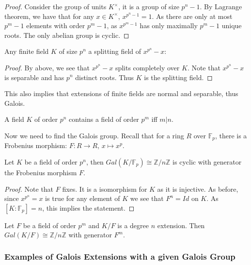 \documentclass[main.tex]{subfiles}
\begin{document}
\begin{proof}
Consider the group of units $K^\times$, it is a group of size $p^n -1$. By Lagrange theorem, we have that for any $x \in K^\times$, $x^{p^n -1} = 1$. As there are only at most $p^m-1$ elements with order $p^m-1$, as $x^{p^m -1}$ has only maximally $p^m -1$ unique roots. The only abelian group is cyclic.
\end{proof}


\begin{lemma}
Any finite field $K$ of size $p^n$ a splitting field of $x^{p^n} -x$:
\end{lemma}

\begin{proof}
By above, we see that $x^{p^n} -x$ splits completely over $K$. Note that $x^{p^n} -x$ is separable and has $p^n$ distinct roots. Thus $K$ is the splitting field.
\end{proof}

This also implies that extensions of finite fields are normal and separable, thus Galois.

A field $K$ of order $p^n$ contains a field of order $p^m$ iff $m | n$. 

Now we need to find the Galois group. Recall that for a ring $R$ over $\mathbb{F}_p$, there is a Frobenius morphism: $F : R \rightarrow R$, $x \mapsto x^p$.

\begin{theorem}
Let $K$ be a field of order $p^n$, then $Gal(K/\mathbb{F}_p) \cong \mathbb{Z}/n\mathbb{Z}$ is cyclic with generator the Frobenius morphism $F$.
\end{theorem}

\begin{proof}
Note that $F$ fixes. It is a isomorphism for $K$ as it is injective. As before, since $x^{p^n} = x$ is true for any element of $K$ we see that $F^n = Id$ on $K$. As $[K : \mathbb{F}_p] = n$, this implies the statement.
\end{proof}

\begin{corollary}
Let $F$ be a field of order $p^m$ and $K/F$ is a degree $n$ extension. Then $Gal(K/F) \cong \mathbb{Z}/n\mathbb{Z}$ with generator $F^m$. 
\end{corollary}


\subsubsection{Examples of Galois Extensions with a given Galois Group}
\end{document}
